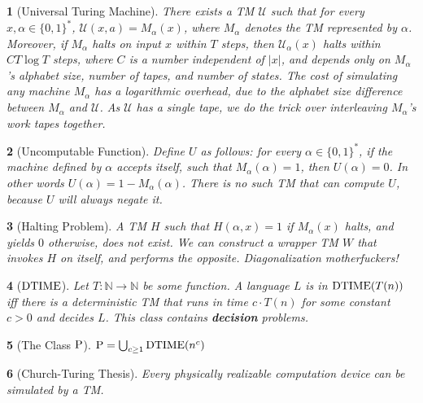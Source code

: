 \documentclass[10pt]{article}
\newtheorem{note}{}[section]
\begin{document}
\begin{note}[Universal Turing Machine]
  There exists a TM $\mathcal{U}$ such that for every
  $x, \alpha \in \{0, 1\}^\ast$, $\mathcal{U}(x, a) = M_\alpha (x)$, where
  $M_\alpha$ denotes the TM represented by $\alpha$.
  Moreover, if $M_\alpha$ halts on input $x$ within $T$ steps, then
  $\mathcal{U}_\alpha (x)$ halts within $C T \log T$ steps, where $C$ is
  a number independent of $|x|$, and depends only on $M_\alpha$'s alphabet
  size, number of tapes, and number of states.
  The cost of simulating any machine $M_\alpha$ has a
  logarithmic overhead, due to the alphabet size difference between
  $M_\alpha$ and $\mathcal{U}$.
  As $\mathcal{U}$ has a single tape, we do the trick over interleaving
  $M_\alpha$'s work tapes together.
\end{note}

\begin{note}[Uncomputable Function]
  Define $U$ as follows: for every $\alpha \in \{0, 1\}^\ast$, if the machine
  defined by $\alpha$ accepts itself, such that $M_\alpha (\alpha) = 1$, then
  $U(\alpha) = 0$.
  In other words $U(\alpha) = 1 - M_\alpha (\alpha)$.
  There is no such TM that can compute $U$, because $U$ will always negate it.
\end{note}

\begin{note}[Halting Problem]
  A TM $H$ such that $H(\alpha, x) = 1$ if $M_\alpha (x)$ halts, and yields
  $0$ otherwise, does not exist.
  We can construct a wrapper TM $W$ that invokes $H$ on itself, and performs
  the opposite.
  Diagonalization motherfuckers!
\end{note}

\begin{note}[$\mathrm{DTIME}$]
  Let $T : \mathbb{N} \to \mathbb{N}$ be some function.
  A language $L$ is in $\mathrm{DTIME}(T(n))$ iff there is a deterministic
  TM that runs in time
  $c \cdot T(n)$ for some constant $c > 0$ and decides $L$.
  This class contains \textbf{decision} problems.
\end{note}

\begin{note}[The Class $\mathrm{P}$]
  $\mathrm{P} = \bigcup_{c \geq 1} \mathrm{DTIME}(n^c)$
\end{note}

\begin{note}[Church-Turing Thesis]
  Every physically realizable computation device can be simulated by a TM.
\end{note}
\end{document}
